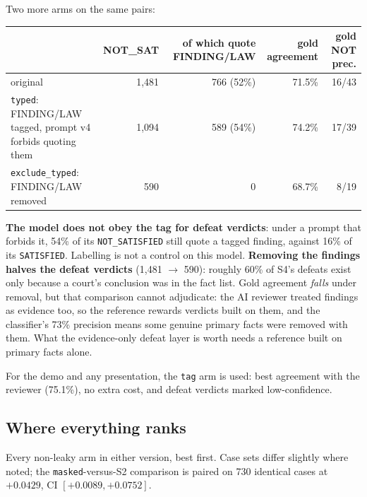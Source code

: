 \documentclass[12pt,a4paper]{article}
\newcommand{\code}[1]{\texttt{\small #1}}
\begin{document}
Two more arms on the same pairs:

\begin{center}
\begin{tabular}{@{}lrrrr@{}}
\toprule
& \textbf{NOT\_SAT} & \textbf{of which quote FINDING/LAW} & \textbf{gold agreement} & \textbf{gold NOT prec.} \\
\midrule
original & 1,481 & 766 (52\%) & 71.5\% & 16/43 \\
\code{typed}: FINDING/LAW tagged, prompt v4 forbids quoting them & 1,094 & 589 (54\%) & 74.2\% & 17/39 \\
\code{exclude\_typed}: FINDING/LAW removed & 590 & 0 & 68.7\% & 8/19 \\
\bottomrule
\end{tabular}
\end{center}

\textbf{The model does not obey the tag for defeat verdicts}: under a prompt that forbids it, 54\% of
its \code{NOT\_SATISFIED} still quote a tagged finding, against 16\% of its \code{SATISFIED}.
Labelling is not a control on this model. \textbf{Removing the findings halves the defeat verdicts}
(1,481 $\rightarrow$ 590): roughly 60\% of S4's defeats exist only because a court's conclusion was
in the fact list. Gold agreement \emph{falls} under removal, but that comparison cannot adjudicate:
the AI reviewer treated findings as evidence too, so the reference rewards verdicts built on them,
and the classifier's 73\% precision means some genuine primary facts were removed with them. What
the evidence-only defeat layer is worth needs a reference built on primary facts alone.

For the demo and any presentation, the \code{tag} arm is used: best agreement with the reviewer
(75.1\%), no extra cost, and defeat verdicts marked low-confidence.

\subsection{Where everything ranks}\label{sec:ranking}

Every non-leaky arm in either version, best first. Case sets differ slightly where noted; the
\code{masked}-versus-S2 comparison is paired on 730 identical cases at $+0.0429$, CI
$[+0.0089, +0.0752]$.
\end{document}

